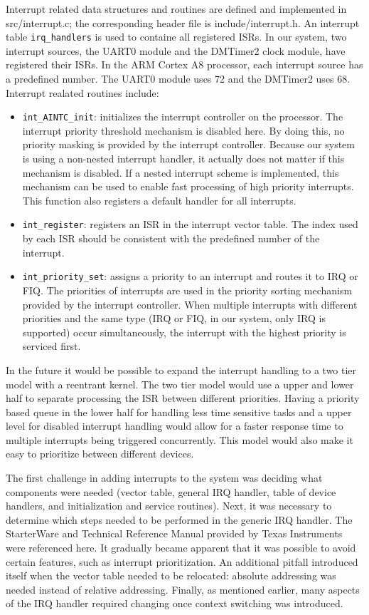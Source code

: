 \documentclass[12pt]{article}
\newcommand{\code}[1]{\colorbox{codegray}{\texttt{\footnotesize{#1}}}}
\begin{document}
Interrupt related data structures and routines are defined and implemented in src/interrupt.c; 
the corresponding header file is include/interrupt.h. An interrupt table 
\code{irq\_handlers} is used to containe all registered ISRs. In our system, two interrupt 
sources, the UART0 module and the DMTimer2 clock module, have registered their ISRs. 
In the ARM Cortex A8 processor, each interrupt source has a predefined number. 
The UART0 module uses 72 and the DMTimer2 uses 68. 
Interrupt realated routines include:
\begin{itemize}
    \item \code{int\_AINTC\_init}: initializes the interrupt controller on the processor. 
    The interrupt priority threshold mechanism is disabled here. By doing this, no priority
    masking is provided by the interrupt controller. Because our system is using a non-nested 
    interrupt handler, it actually does not matter if this mechanism is disabled. 
    If a nested interrupt scheme is implemented, this mechanism can be used to enable fast
    processing of high priority interrupts. This function also registers a default handler for
    all interrupts.
    \item \code{int\_register}: registers an ISR in the interrupt vector table.
    The index used by each ISR should be consistent with the predefined number of the interrupt.
    \item \code{int\_priority\_set}: assigns a priority to an interrupt and routes it to 
    IRQ or FIQ. The priorities of interrupts are used in the priority sorting mechanism
    provided by the interrupt controller. When multiple interrupts with different priorities
    and the same type (IRQ or FIQ, in our system, only IRQ is supported) occur simultaneously,
    the interrupt with the highest priority is serviced first.
\end{itemize}

In the future it would be possible to expand the interrupt handling to a 
two tier model with a reentrant kernel. The two tier model would use a upper
and lower half to separate processing the ISR between different priorities.
Having a priority based queue in the lower half for handling less time sensitive
tasks and a upper level for disabled interrupt handling would allow for a faster
response time to multiple interrupts being triggered concurrently. This model would
also make it easy to prioritize between different devices.

  The first challenge in adding interrupts to the system was deciding
what components were needed (vector table, general IRQ handler, table
of device handlers, and initialization and service routines). Next, it was
necessary to determine which steps needed to be performed in the 
generic IRQ handler. The StarterWare and Technical Reference Manual provided 
by Texas Instruments were referenced here. It gradually became
apparent that it was possible to avoid certain features, such as 
interrupt prioritization. An additional pitfall introduced itself 
when the vector table needed to be relocated: absolute addressing was
needed instead of relative addressing. Finally, as mentioned earlier,
many aspects of the IRQ handler required changing once context switching
was introduced.
\end{document}
